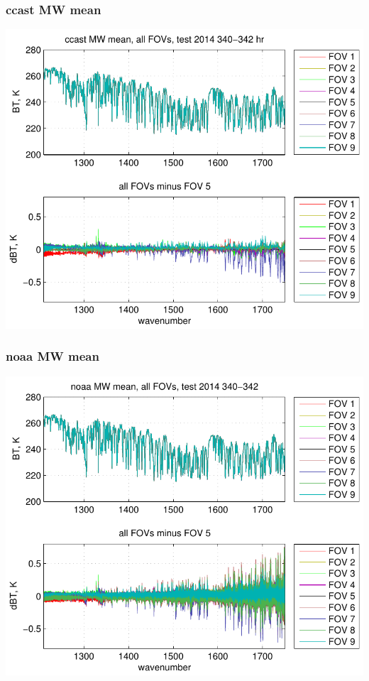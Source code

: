 \documentclass[11pt]{beamer}
\begin{document}
\begin{frame}
\frametitle{ccast MW mean}

\begin{center}
  \includegraphics[scale=0.7]{figures/ccast_MW_avg_2014_340-342_hr.pdf}
\end{center}

\end{frame}
\begin{frame}
\frametitle{noaa MW mean}

\begin{center}
  \includegraphics[scale=0.7]{figures/noaa_MW_avg_2014_340-342.pdf}
\end{center}

\end{frame}
\end{document}
